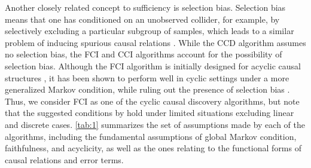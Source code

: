 \documentclass[twoside, 11pt]{article}
\begin{document}
Another closely related concept to sufficiency is selection bias. Selection bias means that one has conditioned on an unobserved collider, for example, by selectively excluding a particular subgroup of samples, which leads to a similar problem of inducing spurious causal relations \citep{versteeg_local_2022, haslbeck_sum_2022}. While the CCD algorithm assumes no selection bias, the FCI and CCI algorithms account for the possibility of selection bias. Although the FCI algorithm is initially designed for acyclic causal structures \citep{spirtes2000}, it has been shown to perform well in cyclic settings under a more generalized Markov condition, while ruling out the presence of selection bias \citep{mooij_classen2020}. Thus, we consider FCI as one of the cyclic causal discovery algorithms, but note that the suggested conditions by \cite{mooij_classen2020} hold under limited situations excluding linear and discrete cases. \autoref{tab:1} summarizes the set of assumptions made by each of the algorithms, including the fundamental assumptions of global Markov condition, faithfulness, and acyclicity, as well as the ones relating to the functional forms of causal relations and error terms.




\end{document}
